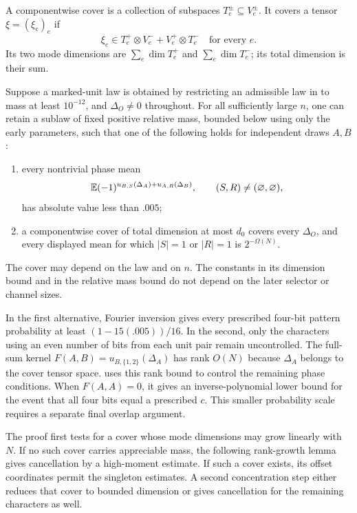 \begin{definition}
A componentwise cover is a collection of subspaces
\(T_e^\pm\subseteq V_e^\pm\). It covers a tensor
\(\xi=(\xi_e)_e\) if
\[
 \xi_e\in T_e^+\otimes V_e^-+V_e^+\otimes T_e^-
 \quad\text{for every }e.
\]
Its two mode dimensions are
\(\sum_e\dim T_e^+\) and \(\sum_e\dim T_e^-\); its total dimension
is their sum.
\end{definition}

\begin{theorem}
\label{thm:phase-alternative}
Suppose a marked-unit law is obtained by restricting an admissible
law in  to mass at least \(10^{-12}\),
and \(\Delta_O\ne0\) throughout. For all sufficiently large \(n\),
one can retain a sublaw of fixed positive relative mass, bounded below
using only the early parameters, such that one of the following holds
for independent draws \(A,B\):
\begin{enumerate}[label=\textup{(\roman*)}]
\item every nontrivial phase mean
\[
 \mathbb E(-1)^{u_{B,S}(\Delta_A)+u_{A,R}(\Delta_B)},
 \qquad(S,R)\ne(\varnothing,\varnothing),
\]
has absolute value less than \(.005\);
\item a componentwise cover of total dimension at most \(d_0\)
covers every \(\Delta_O\), and every displayed mean for which
\(|S|=1\) or \(|R|=1\) is \(2^{-\Omega(N)}\).
\end{enumerate}
The cover may depend on the law and on \(n\). The constants in its
dimension bound and in the relative mass bound do not depend on the
later selector or channel sizes.
\end{theorem}

In the first alternative, Fourier inversion gives every prescribed
four-bit pattern probability at least
\((1-15(.005))/16\). In the second, only the characters using an even
number of bits from each unit pair remain uncontrolled. The full-sum
kernel \(F(A,B)=u_{B,\{1,2\}}(\Delta_A)\) has rank \(O(N)\)
because \(\Delta_A\) belongs to the cover tensor space.
 uses this rank bound to control the remaining
phase conditions. When \(F(A,A)=0\), it gives an inverse-polynomial
lower bound for the event that all four bits equal a prescribed
\(c\). This smaller probability scale requires a separate final
overlap argument.

The proof first tests for a cover whose mode dimensions may grow
linearly with \(N\). If no such cover carries appreciable mass, the
following rank-growth lemma gives cancellation by a high-moment
estimate. If such a cover exists, its offset coordinates permit the
singleton estimates. A second concentration step either reduces that
cover to bounded dimension or gives cancellation for the remaining
characters as well.

